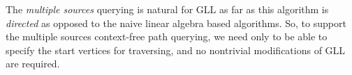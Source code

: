 
The \textit{multiple sources} querying is natural for GLL as far as this algorithm is \textit{directed} as opposed to the naive linear algebra based algorithms. So, to support the multiple sources context-free path querying, we need only to be able to specify the start vertices for traversing, and no nontrivial modifications of GLL are required.  

